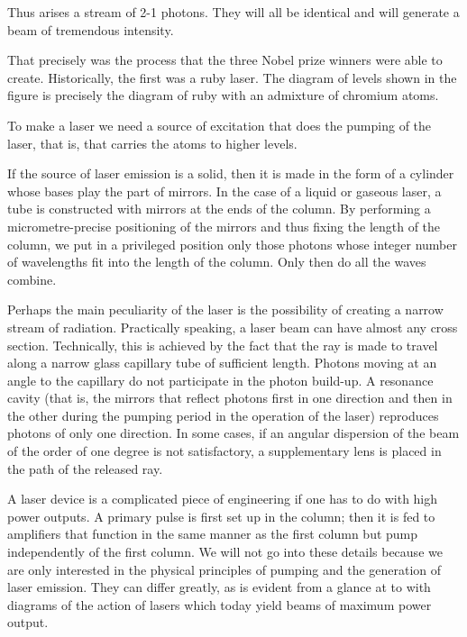 Thus arises a stream of 2-1 photons. They will all be identical and will generate a beam of tremendous intensity.

That precisely was the process that the three Nobel prize winners were able to create. Historically, the first was a ruby laser. The diagram of levels shown in the figure is precisely the diagram of ruby with an admixture of chromium atoms.

To make a laser we need a source of excitation that does the pumping of the laser, that is, that carries the atoms to higher levels.

If the source of laser emission is a solid, then it is made in the form of a cylinder whose bases play the part of mirrors. In the case of a liquid or gaseous laser, a tube is constructed with mirrors at the ends of the column. By performing a micrometre-precise positioning of the mirrors and thus fixing the length of the column, we put in a privileged position only those photons whose integer number of wavelengths fit into the length of the column. Only then do all the waves combine.

Perhaps the main peculiarity of the laser is the possibility of creating a narrow stream of radiation. Practically speaking, a laser beam can have almost any cross section. Technically, this is achieved by the fact that the ray is made to travel along a narrow glass capillary tube of sufficient length. Photons moving at an angle to the capillary do not participate in the photon build-up. A resonance cavity (that is, the mirrors that reflect photons first in one direction and then in the other during the pumping period in the operation of the laser) reproduces photons of only one direction. In some cases, if an angular dispersion of the beam of the order of one degree is not satisfactory, a supplementary lens is placed in the path of the released ray.

A laser device is a complicated piece of engineering if one has to do with high power outputs. A primary pulse is first set up in the column; then it is fed to amplifiers that function in the same manner as the first column but pump independently of the first column. We will not go into these details because we are only interested in the physical principles of pumping and the generation of laser emission. They can differ greatly, as is evident from a glance at  to  with diagrams of the action of lasers which today yield beams of maximum power output.

